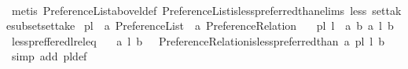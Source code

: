 \begin{isabellebody}
%
\isadelimproof
\ \ %
\endisadelimproof
%
\isatagproof
{}\isamarkupfalse%
\ {\isacharparenleft}{\kern0pt}metis\ Preference{\isacharunderscore}{\kern0pt}List{\isachardot}{\kern0pt}above{\isacharunderscore}{\kern0pt}l{\isacharunderscore}{\kern0pt}def\ Preference{\isacharunderscore}{\kern0pt}List{\isachardot}{\kern0pt}is{\isacharunderscore}{\kern0pt}less{\isacharunderscore}{\kern0pt}preferred{\isacharunderscore}{\kern0pt}than{\isachardot}{\kern0pt}elims{\isacharparenleft}{\kern0pt}{}{\isacharparenright}{\kern0pt}\ less\ set{\isacharunderscore}{\kern0pt}take{\isacharunderscore}{\kern0pt}subset{\isacharunderscore}{\kern0pt}set{\isacharunderscore}{\kern0pt}take{\isacharparenright}{\kern0pt}%
\endisatagproof
{\isafoldproof}%
%
\isadelimproof
\isanewline
%
\endisadelimproof
\isanewline
\isanewline
{}\isamarkupfalse%
\ pl{\isacharunderscore}{\kern0pt}{\isasymalpha}\ {\isacharcolon}{\kern0pt}{\isacharcolon}{\kern0pt}\ {\isachardoublequoteopen}{\isacharprime}{\kern0pt}a\ Preference{\isacharunderscore}{\kern0pt}List\ {\isasymRightarrow}\ {\isacharprime}{\kern0pt}a\ Preference{\isacharunderscore}{\kern0pt}Relation{\isachardoublequoteclose}\ \isanewline
\ \ {\isachardoublequoteopen}pl{\isacharunderscore}{\kern0pt}{\isasymalpha}\ l\ {\isacharequal}{\kern0pt}\ {\isacharbraceleft}{\kern0pt}{\isacharparenleft}{\kern0pt}a{\isacharcomma}{\kern0pt}\ b{\isacharparenright}{\kern0pt}{\isachardot}{\kern0pt}\ a\ {\isasymlesssim}\isactrlsub l\ b{\isacharbraceright}{\kern0pt}{\isachardoublequoteclose}\isanewline
\isanewline
\isanewline
{}\isamarkupfalse%
\ less{\isacharunderscore}{\kern0pt}preffered{\isacharunderscore}{\kern0pt}l{\isacharunderscore}{\kern0pt}rel{\isacharunderscore}{\kern0pt}eq{\isacharcolon}{\kern0pt}\isanewline
\ \ \ {\isachardoublequoteopen}a\ {\isasymlesssim}\isactrlsub l\ b\ {\isasymlongleftrightarrow}\ \ Preference{\isacharunderscore}{\kern0pt}Relation{\isachardot}{\kern0pt}is{\isacharunderscore}{\kern0pt}less{\isacharunderscore}{\kern0pt}preferred{\isacharunderscore}{\kern0pt}than\ a\ {\isacharparenleft}{\kern0pt}pl{\isacharunderscore}{\kern0pt}{\isasymalpha}\ l{\isacharparenright}{\kern0pt}\ b{\isachardoublequoteclose}\isanewline
%
\isadelimproof
\ \ %
\endisadelimproof
%
\isatagproof
{}\isamarkupfalse%
\ {\isacharparenleft}{\kern0pt}simp\ add{\isacharcolon}{\kern0pt}\ pl{\isacharunderscore}{\kern0pt}{\isasymalpha}{\isacharunderscore}{\kern0pt}def{\isacharparenright}{\kern0pt}%
\endisatagproof
{\isafoldproof}%
%
\isadelimproof
\isanewline
%
\endisadelimproof

\end{isabellebody}
